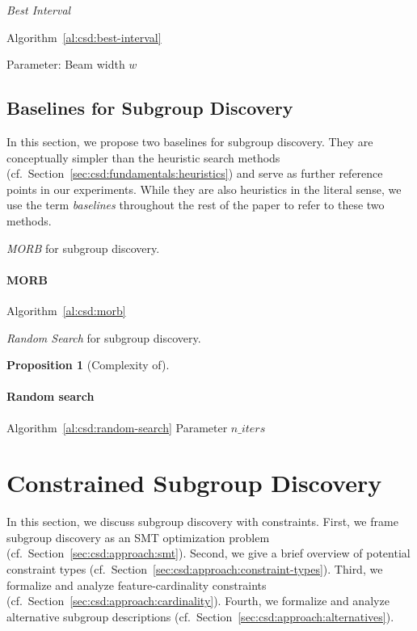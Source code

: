 \documentclass{article}
\newtheorem{proposition}{Proposition}
\theoremstyle{definition}
\begin{document}
\emph{Best Interval}~\cite{mampaey2012efficient}

Algorithm~\ref{al:csd:best-interval}

Parameter: Beam width $w$

\subsection{Baselines for Subgroup Discovery}
\label{sec:csd:fundamentals:baselines}

In this section, we propose two baselines for subgroup discovery.
They are conceptually simpler than the heuristic search methods (cf.~Section~\ref{sec:csd:fundamentals:heuristics}) and serve as further reference points in our experiments.
While they are also heuristics in the literal sense, we use the term  \emph{baselines} throughout the rest of the paper to refer to these two methods.

\begin{algorithm}[t]
	\DontPrintSemicolon
	\caption{\emph{MORB} for subgroup discovery.}
	\label{al:csd:morb}
\end{algorithm}

\paragraph{MORB}

Algorithm~\ref{al:csd:morb}

\begin{algorithm}[t]
	\DontPrintSemicolon
	\caption{\emph{Random Search} for subgroup discovery.}
	\label{al:csd:random-search}
\end{algorithm}

\begin{proposition}[Complexity of]
	\label{prop:csd:complexity-unconstrained-perfect-box}
\end{proposition}

\paragraph{Random search}

Algorithm~\ref{al:csd:random-search}
Parameter $n\_iters$

\section{Constrained Subgroup Discovery}
\label{sec:csd:approach}

In this section, we discuss subgroup discovery with constraints.
First, we frame subgroup discovery as an SMT optimization problem (cf.~Section~\ref{sec:csd:approach:smt}).
Second, we give a brief overview of potential constraint types (cf.~Section~\ref{sec:csd:approach:constraint-types}).
Third, we formalize and analyze feature-cardinality constraints (cf.~Section~\ref{sec:csd:approach:cardinality}).
Fourth, we formalize and analyze alternative subgroup descriptions (cf.~Section~\ref{sec:csd:approach:alternatives}).
\end{document}
